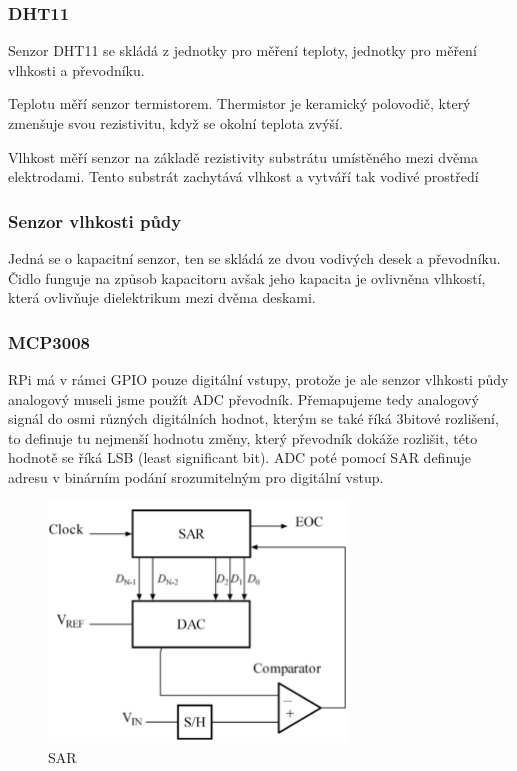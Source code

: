 \documentclass[12pt,a4paper]{article}
\begin{document}
\subsubsection{DHT11}

Senzor DHT11 se skládá z jednotky pro měření teploty, jednotky pro měření
vlhkosti a převodníku.

Teplotu měří senzor termistorem. Thermistor je keramický polovodič, který
zmenšuje svou rezistivitu, když se okolní teplota zvýší.

Vlhkost měří senzor na základě rezistivity substrátu umístěného mezi dvěma
elektrodami. Tento substrát zachytává vlhkost a vytváří tak vodivé prostředí

\subsubsection{Senzor vlhkosti půdy}

Jedná se o kapacitní senzor, ten se skládá ze dvou vodivých desek a převodníku.
Čidlo funguje na způsob kapacitoru avšak jeho kapacita je ovlivněna vlhkostí,
která ovlivňuje dielektrikum mezi dvěma deskami.

\subsubsection{MCP3008}

RPi má v rámci GPIO pouze digitální vstupy, protože je ale senzor vlhkosti půdy
analogový museli jsme použít ADC převodník. Přemapujeme tedy analogový signál
do
osmi různých digitálních hodnot, kterým se také říká 3bitové rozlišení, to
definuje tu nejmenší hodnotu změny, který převodník dokáže rozlišit, této
hodnotě se říká LSB (least significant bit). ADC poté pomocí SAR
definuje adresu v binárním podání srozumitelným pro digitální vstup.

\begin{figure}[h]
	\centering
	\includegraphics[width=8cm]{sar_adc.png}
	\caption{SAR}
\end{figure}
\end{document}
